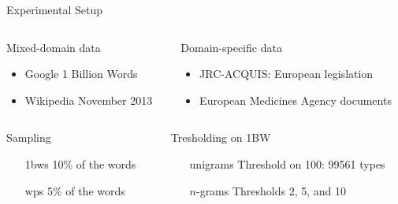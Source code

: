 \documentclass[department=cls, notes={hide notes}, official=true]{beamerruhuisstijl}
\begin{document}
\begin{frame}{Experimental Setup}
	
    \begin{columns}[T]
      \begin{column}[T]{0.4\textwidth}
        \begin{block}{Mixed-domain data}
          \begin{itemize}
            \item Google 1 Billion Words
            \item Wikipedia November 2013
          \end{itemize}
        \end{block}
      \end{column}\hspace{-0.5cm}
      \begin{column}[T]{0.65\textwidth}
        \begin{block}{Domain-specific data}
          \begin{itemize}
            \item JRC-ACQUIS: European legislation
            \item European Medicines Agency documents
          \end{itemize}
        \end{block}
      \end{column}

	\end{columns}
    \quad
   \begin{columns}[T]
      \begin{column}[T]{0.4\textwidth}
        \begin{block}{Sampling}
          \begin{itemize}
            \item[1bws] 10\% of the words
            \item[wps] 5\% of the words
          \end{itemize}
        \end{block}
      \end{column}\hspace{-0.5cm}
      \begin{column}[T]{0.65\textwidth}
        \begin{block}{Tresholding on 1BW}
          \begin{itemize}
            \item[unigrams] Threshold on 100: 99561 types
            \item[$n$-grams] Thresholds 2, 5, and 10
          \end{itemize}
        \end{block}
      \end{column}


\end{columns}
\end{frame}
\end{document}
